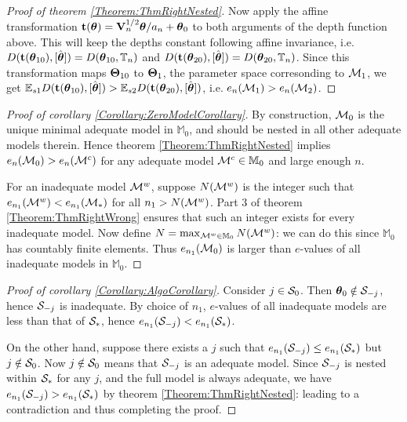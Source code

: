 \begin{proof}[Proof of theorem \ref{Theorem:ThmRightNested}]
Now apply the affine transformation ${\bf{t}} ({\boldsymbol{\theta}}) = {\mathbf{V}}_n^{1/2} {\boldsymbol{\theta}} / a_n + {\boldsymbol{\theta}}_0$ to both arguments of the depth function above. This will keep the depths constant following affine invariance, i.e. $D({\bf{t}} ( {\boldsymbol{\theta}}_{10}), [\hat {{\boldsymbol{\theta}}}]) = D( {\boldsymbol{\theta}}_{10}, {\mathbb{T}}_n)$ and $D({\bf{t}} ( {\boldsymbol{\theta}}_{20}), [\hat {{\boldsymbol{\theta}}}]) = D( {\boldsymbol{\theta}}_{20}, {\mathbb{T}}_n)$. Since this transformation maps ${\boldsymbol{\Theta}}_{10}$ to ${\boldsymbol{\Theta}}_1$, the parameter space corresonding to ${\cal{M}}_1$, we get ${\mathbb{E}}_{s1} D({\bf{t}} ( {\boldsymbol{\theta}}_{10}), [\hat {{\boldsymbol{\theta}}}]) > {\mathbb{E}}_{s2} D({\bf{t}} ( {\boldsymbol{\theta}}_{20}), [\hat {{\boldsymbol{\theta}}}])$, i.e. $e_n ( {\cal{M}}_1 ) > e_n ( {\cal{M}}_2 )$.

\end{proof}

\begin{proof}[Proof of corollary \ref{Corollary:ZeroModelCorollary}]
By construction, ${\cal{M}}_0$ is the unique minimal adequate model in $\mathbb M_{0}$, and should be nested in all other adequate models therein. Hence theorem \ref{Theorem:ThmRightNested} implies $e_n ( {\cal{M}}_0) > e_n ({\cal{M}}^c)$ for any adequate model ${\cal{M}}^c \in \mathbb M_0$ and large enough $n$.

For an inadequate model ${\cal{M}}^w$, suppose $N({\cal{M}}^w)$ is the integer such that $e_{n_1} ( {\cal{M}}^w) < e_{n_1} ({\cal{M}}_{*})$ for all $n_1 > N({\cal{M}}^w)$. Part 3 of theorem \ref{Theorem:ThmRightWrong} ensures that such an integer exists for every inadequate model. Now define $N = \max_{{\cal{M}}^w \in \mathbb M_{0}} N({\cal{M}}^w)$: we can do this since $\mathbb M_{0}$ has countably finite elements. Thus $e_{n_1} ( {\cal{M}}_0 )$ is larger than $e$-values of all inadequate models in $\mathbb M_0$.
\end{proof}

\begin{proof}[Proof of corollary \ref{Corollary:AlgoCorollary}]
Consider $j \in {\cal{S}}_{0}$. Then ${\boldsymbol{\theta}}_0 \notin {\cal{S}}_{-j}$, hence ${\cal{S}}_{-j}$ is inadequate. By choice of $n_1$, $e$-values of all inadequate models are less than that of ${\cal{S}}_{*}$, hence $e_{n_1} ({\cal{S}}_{-j}) < e_{n_1} ({\cal{S}}_{*})$.

On the other hand, suppose there exists a $j$ such that $e_{n_1} ({\cal{S}}_{-j}) \leq e_{n_1} ({\cal{S}}_*)$ but $j \notin {\cal{S}}_{0}$. Now $j \notin {\cal{S}}_{0}$ means that ${\cal{S}}_{-j}$ is an adequate model. Since ${\cal{S}}_{-j} $ is nested within $ {\cal{S}}_{*}$ for any $j$, and the full model is always adequate, we have $e_{n_1} ({\cal{S}}_{-j}) > e_{n_1} ({\cal{S}}_{*})$ by theorem \ref{Theorem:ThmRightNested}: leading to a contradiction and thus completing the proof.
\end{proof}